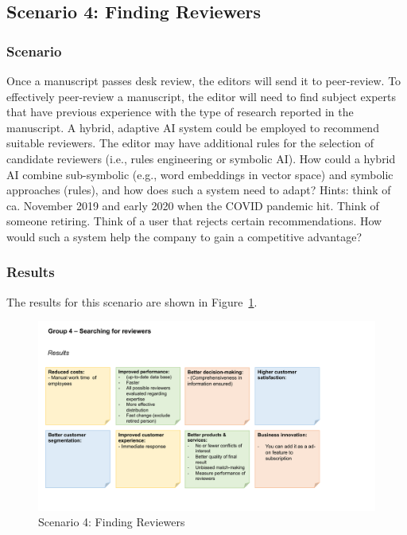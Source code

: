 \newpage
\subsection{Scenario 4: Finding Reviewers}

\subsubsection*{Scenario}

Once a manuscript passes desk review, the editors will send it to peer-review. To effectively peer-review a
manuscript, the editor will need to find subject experts that have previous experience with the type of research
reported in the manuscript. A hybrid, adaptive AI system could be employed to recommend suitable reviewers. The
editor may have additional rules for the selection of candidate reviewers (i.e., rules engineering or symbolic AI).
How could a hybrid AI combine sub-symbolic (e.g., word embeddings in vector space) and symbolic approaches (rules),
and how does such a system need to adapt? Hints: think of ca. November 2019 and early 2020 when the COVID pandemic
hit. Think of someone retiring. Think of a user that rejects certain recommendations. How would such a system help
the company to gain a competitive advantage?

\subsubsection*{Results}

The results for this scenario are shown in Figure~\ref{fig:appendix:fig4}.

\begin{figure}[h!]
    \centering
    \caption{Scenario 4: Finding Reviewers}
    \label{fig:appendix:fig4}
    \includegraphics[width=\textwidth]{figures/results_4.pdf}
\end{figure}








    

